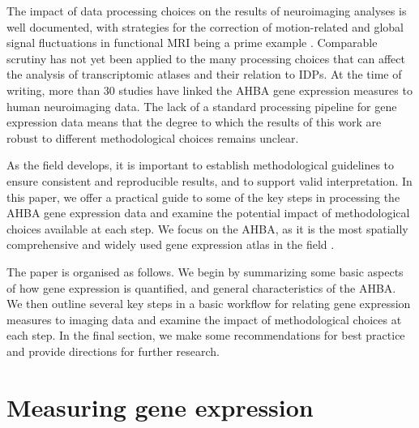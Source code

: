 The impact of data processing choices on the results of neuroimaging analyses is well documented, with strategies for the correction of motion-related and global signal fluctuations in functional MRI being a prime example \citep{Power2015a,Power2017,Ciric2017,Parkes2018}. Comparable scrutiny has not yet been applied to the many processing choices that can affect the analysis of transcriptomic atlases and their relation to IDPs. At the time of writing, more than 30 studies have linked the AHBA gene expression measures to human neuroimaging data. The lack of a standard processing pipeline for gene expression data means that the degree to which the results of this work are robust to different methodological choices remains unclear.

As the field develops, it is important to establish methodological guidelines to ensure consistent and reproducible results, and to support valid interpretation. In this paper, we offer a practical guide to some of the key steps in processing the AHBA gene expression data and examine the potential impact of methodological choices available at each step. We focus on the AHBA, as it is the most spatially comprehensive and widely used gene expression atlas in the field \citep{Hawrylycz2012}.

The paper is organised as follows. We begin by summarizing some basic aspects of how gene expression is quantified, and general characteristics of the AHBA. We then outline several key steps in a basic workflow for relating gene expression measures to imaging data and examine the impact of methodological choices at each step. In the final section, we make some recommendations for best practice and provide directions for further research.


\section{Measuring gene expression}

